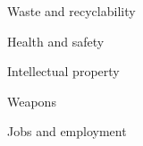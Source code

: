 Waste and recyclability\par
Health and safety\par
Intellectual property\par
Weapons\par
Jobs and employment
